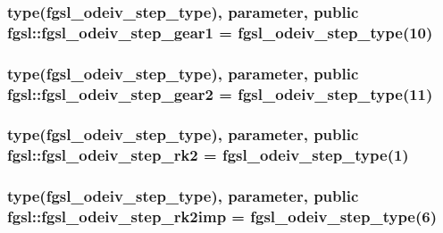 \subsubsection[{fgsl\+\_\+odeiv\+\_\+step\+\_\+gear1}]{\setlength{\rightskip}{0pt plus 5cm}type({\bf fgsl\+\_\+odeiv\+\_\+step\+\_\+type}), parameter, public fgsl\+::fgsl\+\_\+odeiv\+\_\+step\+\_\+gear1 = {\bf fgsl\+\_\+odeiv\+\_\+step\+\_\+type}(10)}\label{namespacefgsl_adc37c503cd35373720d2238db569e06a}
\hypertarget{namespacefgsl_ac5f41836ce32fc0099426b20ac83966c}{}
\subsubsection[{fgsl\+\_\+odeiv\+\_\+step\+\_\+gear2}]{\setlength{\rightskip}{0pt plus 5cm}type({\bf fgsl\+\_\+odeiv\+\_\+step\+\_\+type}), parameter, public fgsl\+::fgsl\+\_\+odeiv\+\_\+step\+\_\+gear2 = {\bf fgsl\+\_\+odeiv\+\_\+step\+\_\+type}(11)}\label{namespacefgsl_ac5f41836ce32fc0099426b20ac83966c}
\hypertarget{namespacefgsl_aa58b6af1260738ff3a83d7910e978b32}{}
\subsubsection[{fgsl\+\_\+odeiv\+\_\+step\+\_\+rk2}]{\setlength{\rightskip}{0pt plus 5cm}type({\bf fgsl\+\_\+odeiv\+\_\+step\+\_\+type}), parameter, public fgsl\+::fgsl\+\_\+odeiv\+\_\+step\+\_\+rk2 = {\bf fgsl\+\_\+odeiv\+\_\+step\+\_\+type}(1)}\label{namespacefgsl_aa58b6af1260738ff3a83d7910e978b32}
\hypertarget{namespacefgsl_a0352c460177df9a983fc5984dd5be04a}{}
\subsubsection[{fgsl\+\_\+odeiv\+\_\+step\+\_\+rk2imp}]{\setlength{\rightskip}{0pt plus 5cm}type({\bf fgsl\+\_\+odeiv\+\_\+step\+\_\+type}), parameter, public fgsl\+::fgsl\+\_\+odeiv\+\_\+step\+\_\+rk2imp = {\bf fgsl\+\_\+odeiv\+\_\+step\+\_\+type}(6)}\label{namespacefgsl_a0352c460177df9a983fc5984dd5be04a}
\hypertarget{namespacefgsl_aba1fcb32d594f9bfa4e3d81e79ea8bff}{}
